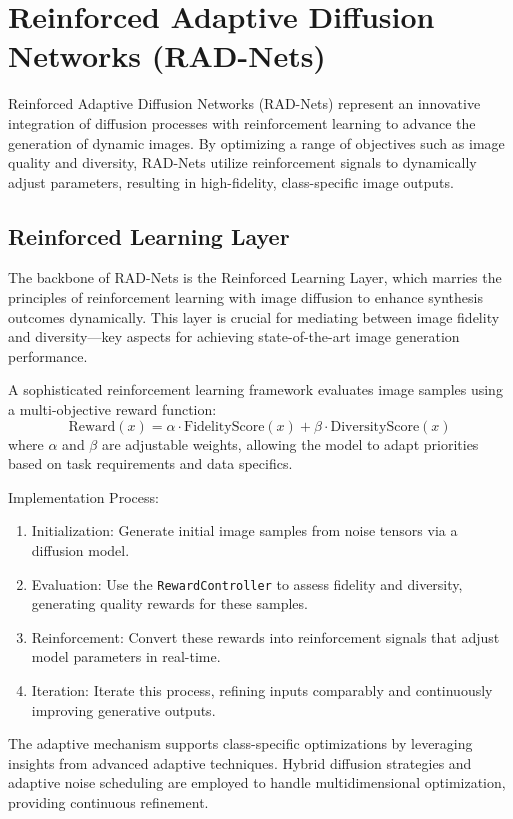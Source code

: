 \section{Reinforced Adaptive Diffusion Networks (RAD-Nets)}

Reinforced Adaptive Diffusion Networks (RAD-Nets) represent an innovative integration of diffusion processes with reinforcement learning to advance the generation of dynamic images. By optimizing a range of objectives such as image quality and diversity, RAD-Nets utilize reinforcement signals to dynamically adjust parameters, resulting in high-fidelity, class-specific image outputs.

\subsection{Reinforced Learning Layer}

The backbone of RAD-Nets is the Reinforced Learning Layer, which marries the principles of reinforcement learning with image diffusion to enhance synthesis outcomes dynamically. This layer is crucial for mediating between image fidelity and diversity—key aspects for achieving state-of-the-art image generation performance. 

A sophisticated reinforcement learning framework evaluates image samples using a multi-objective reward function:
\[ 
\text{Reward}(x) = \alpha \cdot \text{FidelityScore}(x) + \beta \cdot \text{DiversityScore}(x) 
\]
where \(\alpha\) and \(\beta\) are adjustable weights, allowing the model to adapt priorities based on task requirements and data specifics. 

Implementation Process:
\begin{enumerate}
    \item Initialization: Generate initial image samples from noise tensors via a diffusion model.
    \item Evaluation: Use the \texttt{RewardController} to assess fidelity and diversity, generating quality rewards for these samples.
    \item Reinforcement: Convert these rewards into reinforcement signals that adjust model parameters in real-time.
    \item Iteration: Iterate this process, refining inputs comparably and continuously improving generative outputs.
\end{enumerate}

The adaptive mechanism supports class-specific optimizations by leveraging insights from advanced adaptive techniques. Hybrid diffusion strategies and adaptive noise scheduling are employed to handle multidimensional optimization, providing continuous refinement.

